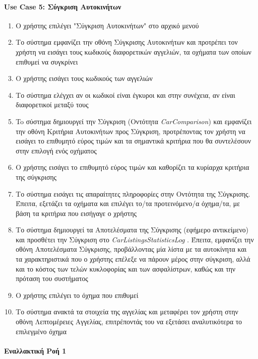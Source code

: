 \documentclass{../ol-softwaremanual}
\begin{document}
	\paragraph{\en Use Case 5: \gr Σύγκριση Αυτοκινήτων}
	\begin{enumerate}
		\item Ο χρήστης επιλέγει \en"\gr Σύγκριση Αυτοκινήτων\en" \gr στο αρχικό μενού
		\item Το σύστημα εμφανίζει την οθόνη Σύγκρισης Αυτοκινήτων και προτρέπει τον χρήστη να εισάγει τους κωδικούς διαφορετικών αγγελιών, τα οχήματα των οποίων επιθυμεί να συγκρίνει
		\item Ο χρήστης εισάγει τους κωδικούς των αγγελιών
		\item Το σύστημα ελέγχει αν οι κωδικοί είναι έγκυροι και στην συνέχεια, αν είναι διαφορετικοί μεταξύ τους
		\item To σύστημα δημιουργεί την Σύγκριση (Οντότητα \en \textit{CarComparison}\gr) και εμφανίζει την οθόνη Κριτήρια Αυτοκινήτων προς Σύγκριση, προτρέποντας τον χρήστη να εισάγει το επιθυμητό εύρος τιμών και τα σημαντικά κριτήρια που θα συντελέσουν στην επιλογή ενός οχήματος
		\item Ο χρήστης εισάγει το επιθυμητό εύρος τιμών και καθορίζει τα κυρίαρχα κριτήρια της σύγκρισης
		\item Το σύστημα εισάγει τις απαραίτητες πληροφορίες στην Οντότητα της Σύγκρισης. Έπειτα, εξετάζει τα οχήματα και επιλέγει το/τα προτεινόμενο/α όχημα/τα, με βάση τα κριτήρια που εισήγαγε ο χρήστης
		\item Το σύστημα δημιουργεί τα Αποτελέσματα της Σύγκρισης (εφήμερο αντικείμενο) και προσθέτει την Σύγκριση στο \en \textit{CarListingsStatisticsLog} \gr. Έπειτα, εμφανίζει την οθόνη Αποτελέσματα Σύγκρισης, προβάλλοντας μία λίστα με τα αυτοκίνητα και τα χαρακτηριστικά που ο χρήστης επέλεξε να πάρουν μέρος στην σύγκριση, αλλά και το κόστος των τελών κυκλοφορίας και των ασφαλίστρων, καθώς και την πρόταση του συστήματος 
		\item Ο χρήστης επιλέγει το όχημα που επιθυμεί
		\item Το σύστημα ανακτά τα στοιχεία της αγγελίας και μεταφέρει τον χρήστη στην οθόνη Λεπτομέρειες Αγγελίας, επιτρέποντάς του να εξετάσει αναλυτικότερα το επιλεγμένο όχημα
	\end{enumerate}
	
	\paragraph{Εναλλακτική Ροή 1}
	
\end{document}

